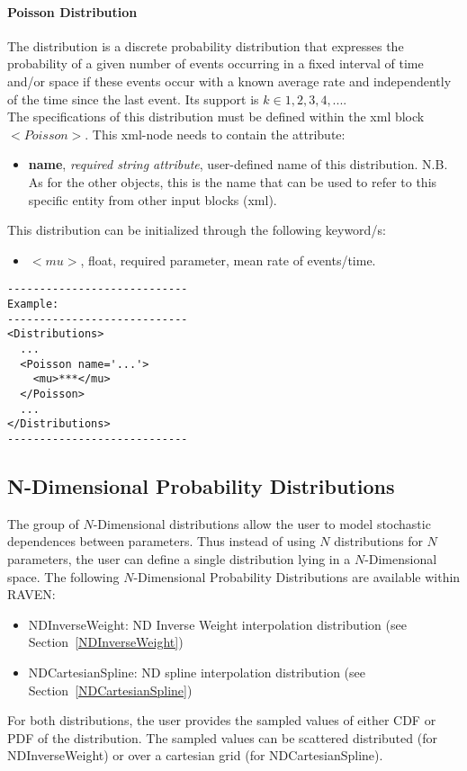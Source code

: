 \paragraph{Poisson Distribution}
\label{Poisson}
The  distribution is a discrete probability distribution that expresses the probability of a given number of events occurring in a fixed interval of time and/or space if these events occur with a known average rate and independently of the time since the last event. Its support is $k \in {1, 2, 3, 4, ...}$.
\\ The specifications of this distribution must be defined within the xml block $<Poisson>$. This xml-node needs to contain the attribute:
\vspace{-5mm}
\begin{itemize}
\itemsep0em
\item \textbf{name}, \textit{required string attribute}, user-defined name of this distribution. N.B. As for the other objects, this is the name that can be used to refer to this specific entity from other input blocks (xml).   
\end{itemize}
\vspace{-5mm}
This distribution can be initialized through the following keyword/s:
\begin{itemize}
\item $<mu>$, float, required parameter, mean rate of events/time.
\end{itemize}

\begin{lstlisting}[style=XML]
----------------------------
Example:
----------------------------
<Distributions>
  ...
  <Poisson name='...'>
    <mu>***</mu>
  </Poisson>
  ...
</Distributions>
----------------------------
\end{lstlisting}

\subsection{N-Dimensional Probability Distributions}
\label{subsec:NdDist}

The group of $N$-Dimensional distributions allow the user to model stochastic dependences between parameters. Thus instead of using $N$ distributions for $N$ parameters, the user can define a single distribution lying in a $N$-Dimensional space.
The following $N$-Dimensional Probability Distributions are available within RAVEN:
\begin{itemize}
\item NDInverseWeight: ND Inverse Weight interpolation distribution (see Section~\ref{NDInverseWeight})
\item NDCartesianSpline: ND spline interpolation distribution (see Section~\ref{NDCartesianSpline})
\end{itemize}
For both distributions, the user provides the sampled values of either CDF or PDF of the distribution. The sampled values can be scattered distributed (for NDInverseWeight) or over a cartesian grid (for NDCartesianSpline).

